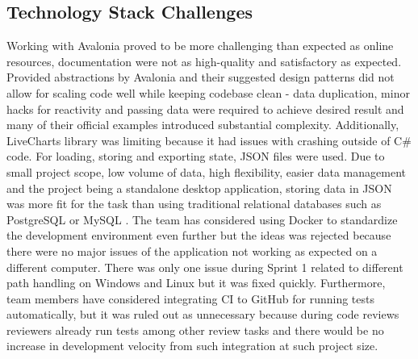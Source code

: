 \subsection*{Technology Stack Challenges}

Working with Avalonia proved to be more challenging than expected as online resources, documentation were not as high-quality and satisfactory as expected. Provided abstractions by Avalonia and their suggested design patterns did not allow for scaling code well while keeping codebase clean - data duplication, minor hacks for reactivity and passing data were required to achieve desired result and many of their official examples introduced substantial complexity. Additionally, LiveCharts library was limiting because it had issues with crashing outside of C\# code. For loading, storing and exporting state, JSON files were used. Due to small project scope, low volume of data, high flexibility, easier data management and the project being a standalone desktop application, storing data in JSON was more fit for the task than using traditional relational databases such as PostgreSQL \cite{postgresql} or MySQL \cite{mysql}. The team has considered using Docker to standardize the development environment even further but the ideas was rejected because there were no major issues of the application not working as expected on a different computer. There was only one issue during Sprint 1 related to different path handling on Windows and Linux but it was fixed quickly. Furthermore, team members have considered integrating CI to GitHub \cite{github} for running tests automatically, but it was ruled out as unnecessary because during code reviews reviewers already run tests among other review tasks and there would be no increase in development velocity from such integration at such project size.


